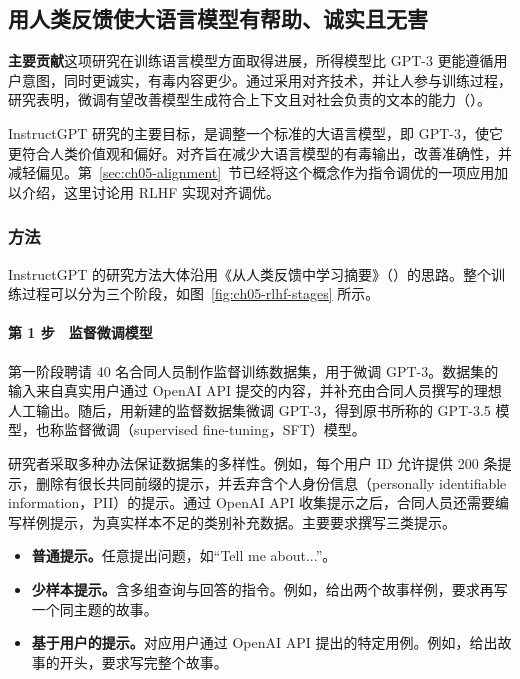 \subsection{用人类反馈使大语言模型有帮助、诚实且无害}
\label{sec:ch05-instruct}
\begin{keypoint}
\noindent\textbf{主要贡献}\quad 这项研究在训练语言模型方面取得进展，所得模型比 GPT-3 更能遵循用户意图，同时更诚实，有毒内容更少。通过采用对齐技术，并让人参与训练过程，研究表明，微调有望改善模型生成符合上下文且对社会负责的文本的能力（）。
\end{keypoint}

InstructGPT 研究的主要目标，是调整一个标准的大语言模型，即 GPT-3，使它更符合人类价值观和偏好。对齐旨在减少大语言模型的有毒输出，改善准确性，并减轻偏见。第~\ref{sec:ch05-alignment}~节已经将这个概念作为指令调优的一项应用加以介绍，这里讨论用 RLHF 实现对齐调优。

\subsubsection{方法}
\label{sec:ch05-instruct-method}
InstructGPT 的研究方法大体沿用《从人类反馈中学习摘要》（）的思路。整个训练过程可以分为三个阶段，如图~\ref{fig:ch05-rlhf-stages} 所示。


\paragraph*{第 1 步　监督微调模型}
第一阶段聘请 40 名合同人员制作监督训练数据集，用于微调 GPT-3。数据集的输入来自真实用户通过 OpenAI API 提交的内容，并补充由合同人员撰写的理想人工输出。随后，用新建的监督数据集微调 GPT-3，得到原书所称的 GPT-3.5 模型，也称监督微调（supervised fine-tuning，SFT）模型。

研究者采取多种办法保证数据集的多样性。例如，每个用户 ID 允许提供 200 条提示，删除有很长共同前缀的提示，并丢弃含个人身份信息（personally identifiable information，PII）的提示。通过 OpenAI API 收集提示之后，合同人员还需要编写样例提示，为真实样本不足的类别补充数据。主要要求撰写三类提示。

\begin{itemize}
\item \textbf{普通提示。}任意提出问题，如“Tell me about...”。
\item \textbf{少样本提示。}含多组查询与回答的指令。例如，给出两个故事样例，要求再写一个同主题的故事。
\item \textbf{基于用户的提示。}对应用户通过 OpenAI API 提出的特定用例。例如，给出故事的开头，要求写完整个故事。
\end{itemize}

